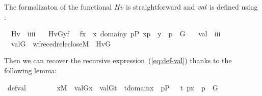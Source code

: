 The formalizaton of the functional $\mathit{Hv}$ is straightforward and $\operatorname{\mathit{val}}$ is defined using :
%
\begin{isabelle}
\isamarkupfalse%
\isanewline
\ \ Hv\ {\isacharcolon}{\isacharcolon}\ {\isachardoublequoteopen}i{\isasymRightarrow}i{\isasymRightarrow}i{\isasymRightarrow}i{\isachardoublequoteclose}\ \isanewline
\ \ {\isachardoublequoteopen}Hv{\isacharparenleft}G{\isacharcomma}y{\isacharcomma}f{\isacharparenright}\ {\isacharequal}{\isacharequal}\ {\isacharbraceleft}\ f{\isacharbackquote}x\ {\isachardot}{\isachardot}\ x{\isasymin}\ domain{\isacharparenleft}y{\isacharparenright}{\isacharcomma}\ {\isasymexists}p{\isasymin}P{\isachardot}\ {\isacharless}x{\isacharcomma}p{\isachargreater}\ {\isasymin}\ y\ {\isasymand}\ p\ {\isasymin}\ G\ {\isacharbraceright}{\isachardoublequoteclose}\isanewline
\isanewline
{}\isamarkupfalse%
\isanewline
\ \ val\ {\isacharcolon}{\isacharcolon}\ {\isachardoublequoteopen}i{\isasymRightarrow}i{\isasymRightarrow}i{\isachardoublequoteclose}\ \isanewline
\ \ {\isachardoublequoteopen}val{\isacharparenleft}G{\isacharcomma}{\isasymtau}{\isacharparenright}\ {\isacharequal}{\isacharequal}\ wfrec{\isacharparenleft}edrel{\isacharparenleft}eclose{\isacharparenleft}M{\isacharparenright}{\isacharparenright}{\isacharcomma}\ {\isasymtau}{\isacharcomma}\ Hv{\isacharparenleft}G{\isacharparenright}{\isacharparenright}{\isachardoublequoteclose}
\end{isabelle}
Then we can recover the recursive expression~(\ref{eq:def-val}) thanks to the
following lemma:
%
\begin{isabelle}
\isamarkupfalse%
\ def{\isacharunderscore}val{\isacharcolon}
\isanewline
\ \ \ \ \ \ \ \  {\isachardoublequoteopen}x{\isasymin}M\ {\isasymLongrightarrow}\ val{\isacharparenleft}G{\isacharcomma}x{\isacharparenright}\ {\isacharequal}\ {\isacharbraceleft}val{\isacharparenleft}G{\isacharcomma}t{\isacharparenright}\ {\isachardot}{\isachardot}\ t{\isasymin}domain{\isacharparenleft}x{\isacharparenright}\ {\isacharcomma}\ {\isasymexists}p{\isasymin}P\ {\isachardot}\ \ {\isasymlangle}t{\isacharcomma}\ p{\isasymrangle}{\isasymin}x\ {\isasymand}\ p\ {\isasymin}\ G\ {\isacharbraceright}{\isachardoublequoteclose}
\end{isabelle}

